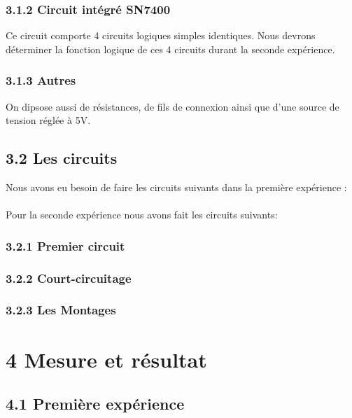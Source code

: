 \documentclass{report}
\begin{document}
\subsubsection*{3.1.2 Circuit int\'egr\'e SN7400}
\hspace*{1,5cm} Ce circuit comporte 4 circuits logiques simples identiques. Nous devrons d\'eterminer la fonction logique de ces 4 circuits durant la seconde exp\'erience.\\

\subsubsection*{3.1.3 Autres}
\hspace*{1,5cm} On dipsose aussi de r\'esistances, de fils de connexion ainsi que d'une source de tension r\'egl\'ee \`a 5V.\\
\newpage

\subsection*{3.2 Les circuits}
\hspace*{1,5cm} Nous avons eu besoin de faire les circuits suivants dans la premi\`ere exp\'erience :\\
\\
\newpage
\hspace*{1,5cm} Pour la seconde exp\'erience nous avons fait les circuits suivants: \\
\subsubsection*{3.2.1 Premier circuit}
\subsubsection*{3.2.2 Court-circuitage}
\subsubsection*{3.2.3 Les Montages} 
\newpage
\section*{4 Mesure et r\'esultat}
\subsection*{4.1 Premi\`ere exp\'erience}
\end{document}
